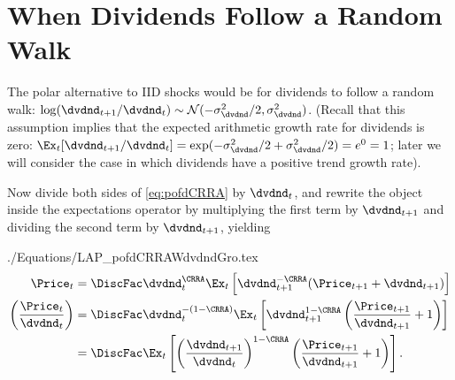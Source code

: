 \documentclass{\handout}
\begin{document}
\section{When Dividends Follow a Random Walk}

The polar alternative to IID shocks would be for dividends to follow a random walk: $\log (\dvdnd_{t+1}/\dvdnd_{t}) \sim \mathcal{N}(-\riskyvar/2,\riskyvar)$.  (Recall that this assumption implies that the expected arithmetic growth rate for dividends is zero: $\Ex_{t}[\dvdnd_{t+1}/\dvdnd_{t}]=\exp(-\riskyvar/2+\riskyvar/2)=e^{0}=1$; later we will consider the case in which dividends have a positive trend growth rate).

Now divide both sides of \eqref{eq:pofdCRRA} by $\dvdnd_{t}$, and rewrite the object inside the expectations operator by multiplying the first term by $\dvdnd_{t+1}$ and dividing the second term by $\dvdnd_{t+1}$, yielding
\begin{verbatimwrite}{./Equations/LAP_pofdCRRAWdvdndGro.tex}
\begin{equation}\begin{gathered}\begin{aligned}
 \Price_{t} & =  \DiscFac \dvdnd_{t}^{\CRRA} \Ex_{t}\left[\dvdnd_{t+1}^{-\CRRA}(\Price_{t+1}+\dvdnd_{t+1})\right] \label{eq:pofdCRRAWdvdndGro}
\\ \left(\frac{\Price_{t}}{\dvdnd_{t}}\right) & =  \DiscFac \dvdnd_{t}^{-(1-\CRRA)} \Ex_{t}\left[\dvdnd_{t+1}^{1-\CRRA}\left(\frac{\Price_{t+1}}{\dvdnd_{t+1}}+1\right)\right] 
\\ & =   \DiscFac  \Ex_{t}\left[\left(\frac{\dvdnd_{t+1}}{\dvdnd_{t}}\right)^{1-\CRRA}\left(\frac{\Price_{t+1}}{\dvdnd_{t+1}}+1\right)\right]
.
\end{aligned}\end{gathered}\end{equation}
\end{verbatimwrite}

\end{document}
